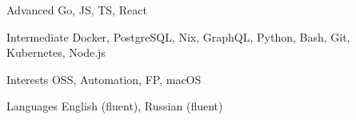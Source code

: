 
\begin{cvskills}

  \cvskill
    {Advanced}
    {Go, JS, TS, React}

    \cvskill
    {Intermediate}
    {Docker, PostgreSQL, Nix, GraphQL, Python, Bash, Git, Kubernetes, Node.js}

   \cvskill
    {Interests}
    {OSS, Automation, FP, macOS}

  \cvskill
    {Languages}
    {English (fluent), Russian (fluent)}

\end{cvskills}
